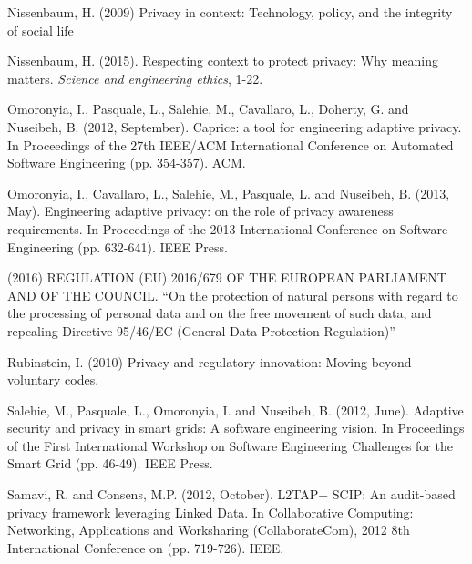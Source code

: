 \documentclass[../thesis.tex]{subfiles}
\begin{document}
\bigskip

Nissenbaum, H. (2009)
Privacy in
context: Technology, policy, and the integrity of social
life \cite{nissenbaum2009privacy}

\bigskip

Nissenbaum, H. (2015). Respecting context to protect privacy: Why
meaning matters. \textit{Science and engineering ethics}, 1-22.
\cite{nissenbaum2015respecting}

\bigskip

Omoronyia, I., Pasquale, L., Salehie, M., Cavallaro, L., Doherty, G. and
Nuseibeh, B. (2012, September). Caprice: a tool for engineering
adaptive privacy. In Proceedings of the 27th IEEE/ACM International
Conference on Automated Software Engineering (pp. 354-357). ACM.
\cite{omoronyia2013engineering}

\bigskip

Omoronyia, I., Cavallaro, L., Salehie, M., Pasquale, L. and Nuseibeh, B.
(2013, May). Engineering adaptive privacy: on the role of privacy
awareness requirements. In Proceedings of the 2013 International
Conference on Software Engineering (pp. 632-641). IEEE Press.
\cite{omoronyia2013engineering}

\bigskip

(2016) REGULATION (EU) 2016/679 OF THE EUROPEAN PARLIAMENT AND OF THE
COUNCIL. ``On the protection of natural persons with
regard to the processing of personal data and on the free movement of
such data, and repealing Directive 95/46/EC (General Data Protection
Regulation)''
\cite{regulation2016regulation}

\bigskip

Rubinstein, I. (2010)
Privacy and regulatory innovation: Moving beyond
voluntary codes.
\cite{rubinstein2010privacy}


\bigskip

Salehie, M., Pasquale, L., Omoronyia, I. and Nuseibeh, B. (2012, June).
Adaptive security and privacy in smart grids: A software engineering
vision. In Proceedings of the First International Workshop on Software
Engineering Challenges for the Smart Grid (pp. 46-49). IEEE Press.
\cite{salehie2012adaptive}

\bigskip

Samavi, R. and Consens, M.P. (2012, October). L2TAP+ SCIP: An
audit-based privacy framework leveraging Linked Data. In Collaborative
Computing: Networking, Applications and Worksharing (CollaborateCom),
2012 8th International Conference on (pp. 719-726). IEEE.
\cite{samavi2012l2tap+}
\end{document}
